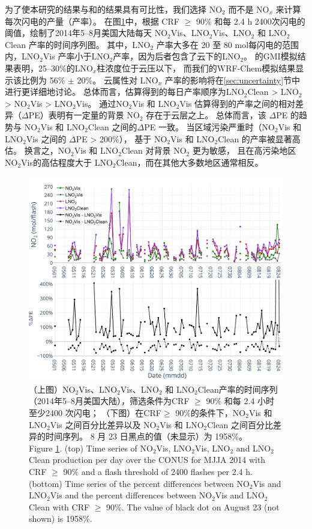 为了使本研究的结果与\citet{Pickering.2016}和\citet{Lapierre.2020}的结果具有可比性，我们选择 NO$_2$  而不是 NO$_x$  来计算每次闪电的产量（产率）。
在图\ref{fig:us_pe_timeseries}中，根据 CRF $\geq$ 90\% 和每 2.4 h 2400次闪电的阈值，绘制了2014年5--8月美国大陆每天 NO$_2$Vis、LNO$_2$Vis、LNO$_2$ 和 LNO$_2$Clean 产率的时间序列图。
其中，LNO$_2$ 产率大多在 20 至 80 mol每闪电的范围内，LNO$_2$Vis 产率小于LNO$_2$产率，因为后者包含了云下的LNO$_2$。
\citet{Pickering.2016}的GMI模拟结果表明，25--30\%的LNO$_x$柱浓度位于云压以下，
而我们的WRF-Chem模拟结果显示该比例为 56\% $\pm$ 20\%。
云属性对 LNO$_x$ 产率的影响将在\ref{sec:uncertainty}节中进行更详细地讨论。
总体而言，估算得到的每日产率顺序为LNO$_2$Clean > LNO$_2$ > NO$_2$Vis > LNO$_2$Vis。
通过NO$_2$Vis 和 LNO$_2$Vis 估算得到的产率之间的相对差异（$\Delta$PE）表明有一定量的背景 NO$_2$ 存在于云层之上。
总体而言，该 $\Delta$PE 的趋势与 NO$_2$Vis 和 LNO$_2$Clean 之间的$\Delta$PE 一致。
当区域污染严重时（NO$_2$Vis 和 LNO$_2$Vis 之间的 $\Delta$PE > 200\%），
基于 NO$_2$Vis 和 LNO$_2$Clean 的产率被显著高估。
换言之，NO$_2$Vis 和 LNO$_2$Clean 对背景 NO$_2$ 更为敏感，
且在高污染地区NO$_2$Vis的高估程度大于 LNO$_2$Clean，而在其他大多数地区通常相反。

\begin{figure}[!htbp]
\centering
\includegraphics[width=12cm]{./figures/us_pe_timeseries.png}
\caption{（上图）NO$_2$Vis、LNO$_2$Vis、LNO$_2$ 和 LNO$_2$Clean产率的时间序列（2014年5--8月美国大陆），筛选条件为CRF $\geq$ 90\% 和每 2.4 小时 至少2400 次闪电；
（下图）在CRF$\geq$ 90\%的条件下，NO$_2$Vis 和 LNO$_2$Vis 之间百分比差异以及 NO$_2$Vis 和 LNO$_2$Clean 之间百分比差异的时间序列。
8 月 23 日黑点的值（未显示）为 1958\%。\\
Figure \ref{fig:us_pe_timeseries}. (top) Time series of NO$_2$Vis, LNO$_2$Vis, LNO$_2$ and LNO$_2$Clean production per day over the CONUS for MJJA 2014 with CRF $\geq$ 90\% and a flash threshold of 2400 flashes per 2.4 h.
(bottom) Time series of the percent differences between NO$_2$Vis and LNO$_2$Vis and the percent differences between NO$_2$Vis and LNO$_2$Clean with CRF $\geq$ 90\%.
The value of black dot on August 23 (not shown) is 1958\%.}
\label{fig:us_pe_timeseries}
\end{figure}

